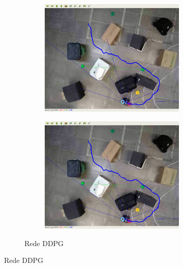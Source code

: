 \begin{figure}[H]
\begin{center}
\begin{subfigure}[b]{0.60\textwidth}
\begin{subfigure}[b]{0.24\textwidth}
            \includegraphics[width=\textwidth]{imagens/real_envs/real_env2_ddpg/7.png}
        \end{subfigure}
        \hfill
        \begin{subfigure}[b]{0.24\textwidth}
            \includegraphics[width=\textwidth]{imagens/real_envs/real_env2_ddpg/7.png}
        \end{subfigure}
        \caption{Rede DDPG}
        \label{subfig:real_env2_ddpg}
    \end{subfigure}
      

\end{center}
\end{figure}
